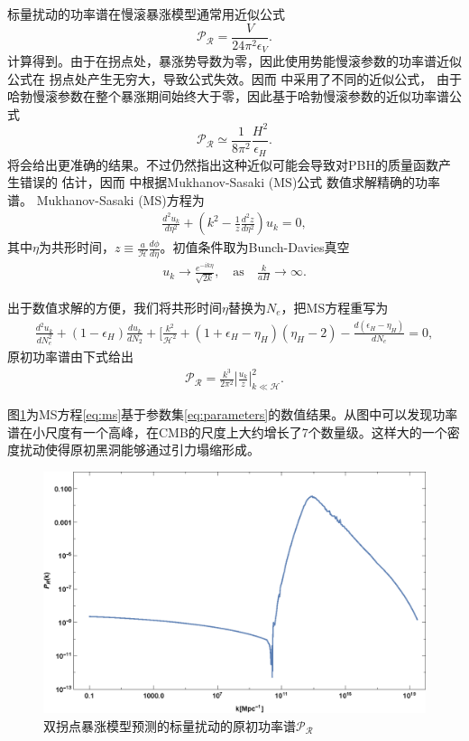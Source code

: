 标量扰动的功率谱在慢滚暴涨模型通常用近似公式
\begin{equation}
  \label{eq:scalar-perturbation-power-spectrum}
  \mathcal{P}_{\mathcal{R}} = \frac{V}{24\pi^2 \epsilon_V}.
\end{equation}
计算得到。由于在拐点处，暴涨势导数为零，因此使用势能慢滚参数的功率谱近似公式在
拐点处产生无穷大，导致公式失效。因而
\citep{germani2017primordial,motohashi2017primordial}中采用了不同的近似公式，
由于哈勃慢滚参数在整个暴涨期间始终大于零，因此基于哈勃慢滚参数的近似功率谱公式
\begin{equation}
  \label{eq:scalar-perturbation-power-spectrum-hubble}
  \mathcal{P}_{\mathcal{R}} \simeq
  \frac{1}{8\pi^2}\frac{H^2}{\epsilon_H}.
\end{equation}
将会给出更准确的结果。不过仍然指出这种近似可能会导致对PBH的质量函数产生错误的
估计，因而 \citep{ballesteros2018primordial}中根据Mukhanov-Sasaki (MS)公式
\citep{sasaki1986large,mukhanov1988quantum}数值求解精确的功率谱。 
Mukhanov-Sasaki (MS)方程为
\begin{align}\label{eq:ms}
    \frac{d^2u_k}{d\eta^2}+\left(k^2-\frac{1}{z}\frac{d^2z}{d\eta^2}\right)u_k=0,
\end{align}
其中$\eta$为共形时间，$z\equiv\frac{a}{\mathcal{H}}\frac{d\phi}{d\eta}$。初值条件取为Bunch-Davies真空\citep{bunch1978quantum}
\begin{align}
    u_k\rightarrow\frac{e^{-ik\eta}}{\sqrt{2k}},\quad\text{as}\quad
    \frac{k}{aH}\rightarrow\infty.
\end{align}

出于数值求解的方便，我们将共形时间$\eta$替换为$N_e$，把MS方程重写为\citep{ballesteros2018primordial}
\begin{align}
    \frac{d^2u_k}{dN^2_e}+\left(1-\epsilon_H\right)\frac{du_k}{dN_2}+
    \lbrack\frac{k^2}{\mathcal{H}^2}+\left(1+\epsilon_H-\eta_H\right)\left(\eta_H-2\right)-\frac{d\left(\epsilon_H-\eta_H\right)}{dN_e}=0,
\end{align}
原初功率谱由下式给出
\begin{align}
    \mathcal{P_R}=\frac{k^3}{2\pi^2}\left\lvert\frac{u_k}{z}\right\rvert^2_{k\ll
    \mathcal{H}}.
\end{align}

图\ref{fig:pert}为MS方程\ref{eq:ms}基于参数集\ref{eq:parameters}的数值结果。从图中可以发现功率谱在小尺度有一个高峰，在CMB的尺度上大约增长了7个数量级。这样大的一个密度扰动使得原初黑洞能够通过引力塌缩形成。

\begin{figure}[!htbp]
    \centering
    \includegraphics[width=5in]{Img/pert.eps}
    \caption{双拐点暴涨模型预测的标量扰动的原初功率谱$\mathcal{P_R}$}\label{fig:pert}
\end{figure}
